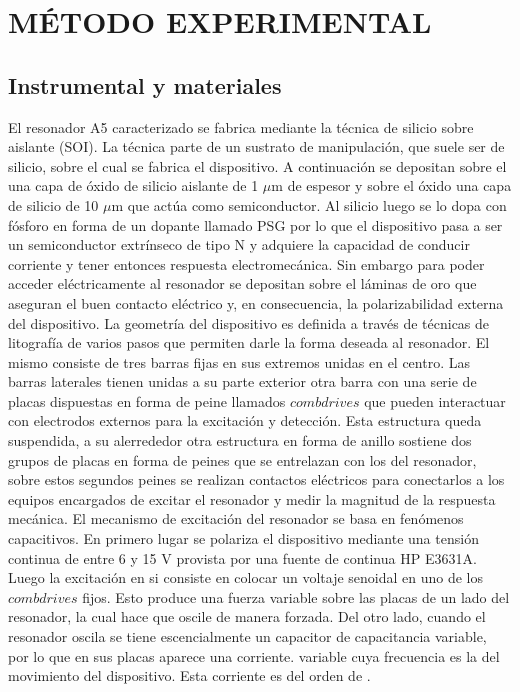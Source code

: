 \section{MÉTODO EXPERIMENTAL}

\subsection{Instrumental y materiales}
El resonador A5 caracterizado se fabrica mediante la técnica de silicio sobre aislante (SOI). La técnica parte de un sustrato de manipulación, que suele ser de silicio, sobre el cual se fabrica el dispositivo. A continuación se depositan sobre el una capa de óxido de silicio aislante de 1 $\mu$m de espesor y sobre el óxido una capa de silicio de 10 $\mu$m que actúa como semiconductor. Al silicio luego se lo dopa con fósforo en forma de un dopante llamado PSG por lo que el dispositivo pasa a ser un semiconductor extrínseco de tipo N y adquiere la capacidad de conducir corriente y tener entonces respuesta electromecánica. Sin embargo para poder acceder eléctricamente al resonador se depositan sobre el láminas de oro que aseguran el buen contacto eléctrico y, en consecuencia, la polarizabilidad externa del dispositivo. La geometría del dispositivo es definida a través de técnicas de litografía de varios pasos que permiten darle la forma deseada al resonador.
El mismo consiste de tres barras fijas en sus extremos unidas en el centro. Las barras laterales tienen unidas a su parte exterior otra barra con una serie de placas dispuestas en forma de peine llamados $comb drives$ que pueden interactuar con electrodos externos para la excitación y detección. Esta estructura queda suspendida, a su alerrededor otra estructura en forma de anillo sostiene dos grupos de placas en forma de peines que se entrelazan con los del resonador, sobre estos segundos peines se realizan contactos eléctricos para conectarlos a los equipos encargados de excitar el resonador y medir la magnitud de la respuesta mecánica.
El mecanismo de excitación del resonador se basa en fenómenos capacitivos. En primero lugar se polariza el dispositivo mediante una tensión continua de entre 6 y 15 V provista por una fuente de continua HP E3631A. Luego la excitación en si consiste en colocar un voltaje senoidal en uno de los $comb drives$ fijos. Esto produce una fuerza variable sobre las placas de un lado del resonador, la cual hace que oscile de manera forzada. Del otro lado, cuando el resonador oscila se tiene escencialmente un capacitor de capacitancia variable, por lo que en sus placas aparece una corriente. variable cuya frecuencia es la del movimiento del dispositivo. Esta corriente es del orden de .  
